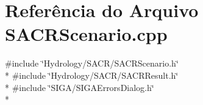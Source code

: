 \section{Referência do Arquivo S\+A\+C\+R\+Scenario.\+cpp}
\label{_s_a_c_r_scenario_8cpp}
{\ttfamily \#include \char`\"{}Hydrology/\+S\+A\+C\+R/\+S\+A\+C\+R\+Scenario.\+h\char`\"{}}\\*
{\ttfamily \#include \char`\"{}Hydrology/\+S\+A\+C\+R/\+S\+A\+C\+R\+Result.\+h\char`\"{}}\\*
{\ttfamily \#include \char`\"{}S\+I\+G\+A/\+S\+I\+G\+A\+Errors\+Dialog.\+h\char`\"{}}\\*
